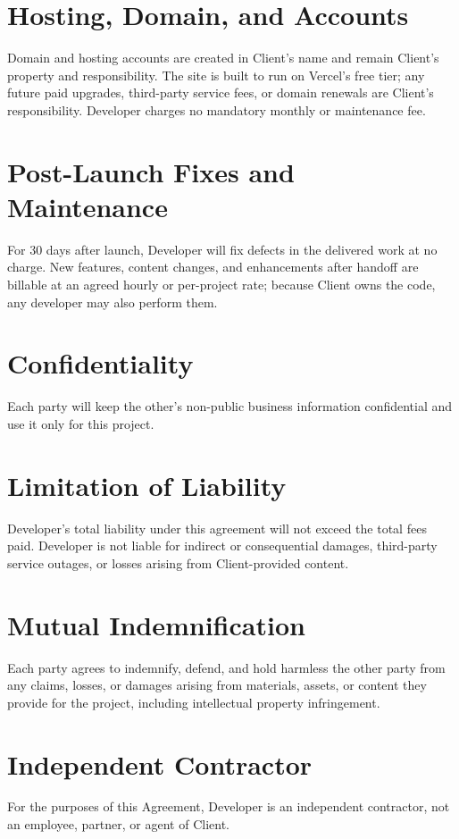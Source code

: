 \documentclass[11pt]{article}
\begin{document}
\begin{Form}
\section{Hosting, Domain, and Accounts}
Domain and hosting accounts are created in Client's name and remain Client's property and responsibility. The site is built to run on Vercel's free tier; any future paid upgrades, third-party service fees, or domain renewals are Client's responsibility. Developer charges no mandatory monthly or maintenance fee.

\section{Post-Launch Fixes and Maintenance}
For 30 days after launch, Developer will fix defects in the delivered work at no charge. New features, content changes, and enhancements after handoff are billable at an agreed hourly or per-project rate; because Client owns the code, any developer may also perform them.

\section{Confidentiality}
Each party will keep the other's non-public business information confidential and use it only for this project.

\section{Limitation of Liability}
Developer's total liability under this agreement will not exceed the total fees paid. Developer is not liable for indirect or consequential damages, third-party service outages, or losses arising from Client-provided content.

\section{Mutual Indemnification}
Each party agrees to indemnify, defend, and hold harmless the other party from any claims, losses, or damages arising from materials, assets, or content they provide for the project, including intellectual property infringement.

\section{Independent Contractor}
For the purposes of this Agreement, Developer is an independent contractor, not an employee, partner, or agent of Client.


\end{Form}
\end{document}
